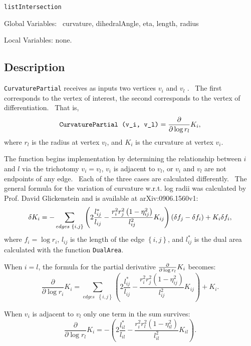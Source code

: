 \qquad\texttt{listIntersection}

Global Variables: \ curvature, dihedralAngle, eta, length, radius

Local Variables: none.

\subsection*{Description}

\texttt{CurvaturePartial} receives as inputs two vertices $v_{i}$ and $v_{l}$%
. \ The first corresponds to the vertex of interest, the second corresponds
to the vertex of differentiation. \ That is,%
\begin{equation*}
\text{\texttt{CurvaturePartial (v\_i, v\_l)}}=\frac{\partial }{\partial \log
r_{l}}K_{i},
\end{equation*}%
where $r_{l}$ is the radius at vertex $v_{l}$, and $K_{i}$ is the curvature
at vertex $v_{i}$. \ 

The function begins implementation by determining the relationship between $i
$ and $l$ via the trichotomy $v_{i}=v_{l}$, $v_{i}$ is adjacent to $v_{l}$,
or $v_{i}$ and $v_{l}$ are not endpoints of any edge. \ Each of the three
cases are calculated differently. \ The general formula for the variation of
curvature w.r.t. log radii was calculated by Prof. David Glickenstein and is
available at arXiv:0906.1560v1:%
\begin{equation*}
\delta K_{i}=-\sum_{edges\text{ }\left\{ i,j\right\} }\left( 2\frac{%
l_{ij}^{\ast }}{l_{ij}}-\frac{r_{i}^{2}r_{j}^{2}\left( 1-\eta
_{ij}^{2}\right) }{l_{ij}^{2}}K_{ij}\right) \left( \delta f_{j}-\delta
f_{i}\right) +K_{i}\delta f_{i},
\end{equation*}%
where $f_{i}=\log r_{i}$, $l_{ij}$ is the length of the edge $\left\{
i,j\right\} $, and $l_{ij}^{\ast }$ is the dual area calculated with the
function \texttt{DualArea}.

When $i=l$, the formula for the partial derivative $\frac{\partial}{%
\partial\log r_{l}}K_{i}$ becomes:%
\begin{equation*}
\frac{\partial}{\partial\log r_{i}}K_{i}=\sum_{edges\text{ }\left\{
i,j\right\} }\left( 2\frac{l_{ij}^{\ast}}{l_{ij}}-\frac{r_{i}^{2}r_{j}^{2}%
\left( 1-\eta_{ij}^{2}\right) }{l_{ij}^{2}}K_{ij}\right) +K_{i}.
\end{equation*}

When $v_{i}$ is adjacent to $v_{l}$ only one term in the sum survives:%
\begin{equation*}
\frac{\partial}{\partial\log r_{l}}K_{i}=-\left( 2\frac{l_{il}^{\ast}}{l_{il}%
}-\frac{r_{i}^{2}r_{l}^{2}\left( 1-\eta_{il}^{2}\right) }{l_{il}^{2}}%
K_{il}\right) .
\end{equation*}

